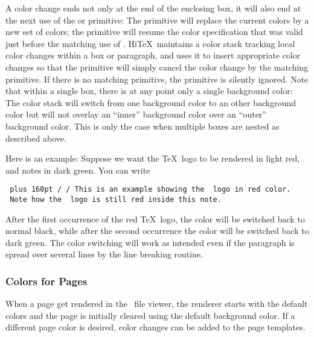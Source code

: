 A color change ends not only at the end of the enclosing box,
it will also end at the next use of the 
or  primitive:
The  primitive will replace the current colors by
a new set of colors; the  primitive will resume
the color specification that was valid just before the matching use
of . Hi\TeX\ maintains a color stack tracking
local color changes within a box or paragraph, and uses it to
insert appropriate color changes so that the  primitive
will simply cancel the color change by the matching  primitive.
If there is no matching  primitive,
the  primitive is silently ignored.
Note that within a single box, there is at any point only a single
background color: The color stack will switch from one background
color to an other background color but will not overlay an ``inner''
background color over an ``outer'' background color.
This is only the case when multiple boxes are nested as described above.

Here is an example:
Suppose we want the \TeX\ logo to be rendered in light red,
and notes in dark green. You can write
\medskip
{\tt\parindent 0pt\rightskip=0pt plus 160pt
\verbatim/\def\redTeX{\HINTcolor{fg{1 0.3 0.3}}\TeX\HINTendcolor}
\def\beginnote{\HINTcolor{fg{0 0.5 0}}}% dark green
\def\endnote{\HINTendcolor}/
\medskip
This is an example showing the \BS\ logo in red color.
\ Note how the \BS\ logo is still red inside
this note.\par}
\medskip

After the first occurrence of the red \TeX\ logo, the color will be switched
back to normal black, while after the second occurrence the color will
be switched back to dark green. The color switching will work as intended
even if the paragraph is spread over several lines by the line breaking routine.

\subsubsection{Colors for Pages}
When a page get rendered in the \HINT\ file viewer,
the renderer starts with the default colors and the page is initially
cleared using the default background color. If a different page
color is desired, color changes can be added to the page templates.

